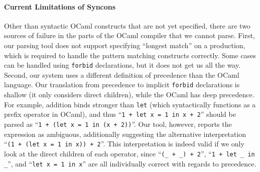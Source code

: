 \documentclass[acmsmall,review,anonymous]{acmart}\settopmatter{printfolios=true,printccs=false,printacmref=false}
\newcommand{\ocaml}{\lstinline[language={[objective]caml}]}
\newcommand{\syncon}{\lstinline[language=syncon]}
\begin{document}
\paragraph{Current Limitations of Syncons}
%
Other than syntactic OCaml constructs that are not yet specified,
there are two sources of failure in the parts of the OCaml
compiler that we cannot parse.
%
First, our parsing tool does not support specifying ``longest
match'' on a production, which is required to handle the pattern
matching constructs correctly. Some cases can be handled using
\syncon{forbid} declarations, but it does not get us all the way.
%
Second, our system uses a different definition of precedence than
the OCaml language. Our translation from precedence to implicit
\syncon{forbid} declarations is shallow (it only considers direct
children), while the OCaml has deep precedence. For example,
addition binds stronger than \ocaml{let} (which syntactically
functions as a prefix operator in OCaml), and thus
%
``\ocaml{1 + let x = 1 in x + 2}'' should be parsed as
%
``\ocaml{1 + (let x = 1 in (x + 2))}''. Our tool, however, reports
the expression as ambiguous, additionally suggesting the
alternative interpretation
%
``\ocaml{(1 + (let x = 1 in x)) + 2}''.
%
This interpretation is indeed valid if we only look at the direct
children of each operator, since ``\ocaml{(_ + _) + 2}'',
``\ocaml{1 + let _ in _}'', and ``\ocaml{let x = 1 in x}'' are all
individually correct with regards to precedence.


\end{document}
